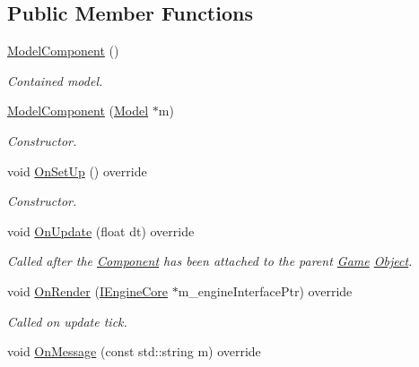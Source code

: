 \subsection*{Public Member Functions}
\begin{DoxyCompactItemize}
\item 
\hypertarget{class_model_component_a82182f738137f91b12cd90624ca7e458}{\hyperlink{class_model_component_a82182f738137f91b12cd90624ca7e458}{Model\+Component} ()}\label{class_model_component_a82182f738137f91b12cd90624ca7e458}

\begin{DoxyCompactList}\small\item\em Contained model. \end{DoxyCompactList}\item 
\hypertarget{class_model_component_ad2cbf905edaace2b6db04b8a591ff593}{\hyperlink{class_model_component_ad2cbf905edaace2b6db04b8a591ff593}{Model\+Component} (\hyperlink{class_model}{Model} $\ast$m)}\label{class_model_component_ad2cbf905edaace2b6db04b8a591ff593}

\begin{DoxyCompactList}\small\item\em Constructor. \end{DoxyCompactList}\item 
void \hyperlink{class_model_component_ac8474d853392a16c6879fdf1bfe6597f}{On\+Set\+Up} () override
\begin{DoxyCompactList}\small\item\em Constructor. \end{DoxyCompactList}\item 
\hypertarget{class_model_component_a5def59776319943854fb5da3dc515051}{void \hyperlink{class_model_component_a5def59776319943854fb5da3dc515051}{On\+Update} (float dt) override}\label{class_model_component_a5def59776319943854fb5da3dc515051}

\begin{DoxyCompactList}\small\item\em Called after the \hyperlink{class_component}{Component} has been attached to the parent \hyperlink{class_game}{Game} \hyperlink{class_object}{Object}. \end{DoxyCompactList}\item 
void \hyperlink{class_model_component_a2d6c1972533982e1a8c6444a6f0a4120}{On\+Render} (\hyperlink{class_i_engine_core}{I\+Engine\+Core} $\ast$m\+\_\+engine\+Interface\+Ptr) override
\begin{DoxyCompactList}\small\item\em Called on update tick. \end{DoxyCompactList}\item 
\hypertarget{class_model_component_a48d6170e857f323839039ce54e9418e1}{void \hyperlink{class_model_component_a48d6170e857f323839039ce54e9418e1}{On\+Message} (const std\+::string m) override}\label{class_model_component_a48d6170e857f323839039ce54e9418e1}


\end{DoxyCompactItemize}

